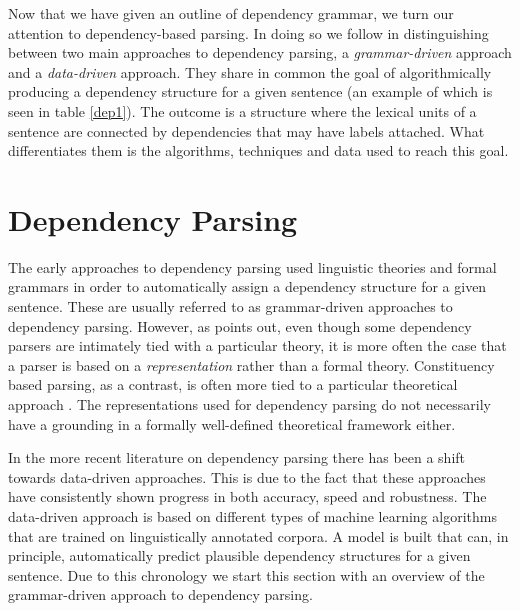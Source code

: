 Now that we have given an outline of dependency grammar, we turn our attention to dependency-based parsing. In doing so we follow  in distinguishing between two main approaches to dependency parsing, a \textit{grammar-driven} approach and a \textit{data-driven} approach. They share in common the goal of algorithmically producing a dependency structure for a given sentence (an example of which is seen in table \ref{dep1}). The outcome is a structure where the lexical units of a sentence are connected by dependencies that may have labels attached. What differentiates them is the algorithms, techniques and data used to reach this goal.

\section{Dependency Parsing}
\label{parsing}

The early approaches to dependency parsing used linguistic theories and formal grammars in order to automatically assign a dependency structure for a given sentence. These are usually referred to as grammar-driven approaches to dependency parsing. However, as \citeauthor{Niv:05} points out, even though some dependency parsers are intimately tied with a particular theory, it is more often the case that a parser is based on a \textit{representation} rather than a formal theory. Constituency based parsing, as a contrast, is often more tied to a particular theoretical approach \cite{Niv:05}. The representations used for dependency parsing do not necessarily have a grounding in a formally well-defined theoretical framework either. 


In the more recent literature on dependency parsing there has been a shift towards data-driven approaches. This is due to the fact that these approaches have consistently shown progress in both accuracy, speed and robustness. The data-driven approach is based on different types of machine learning algorithms that are trained on linguistically annotated corpora. A model is built that can, in principle, automatically predict plausible dependency structures for a given sentence. Due to this chronology we start this section with an overview of the grammar-driven approach to dependency parsing.

